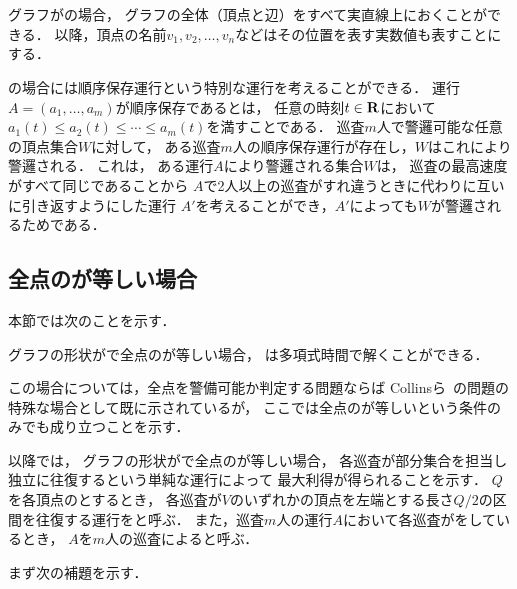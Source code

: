 \section{{\graphLine}}
\label{section: line}

グラフが{\graphLine}の場合，
グラフの全体（頂点と辺）をすべて実直線上におくことができる．
以降，頂点の名前$v_1, v_2, \ldots, v_n$などはその位置を表す実数値も表すことにする．

{\graphLine}の場合には順序保存運行という特別な運行を考えることができる．
運行$A = (a_1, \ldots, a_m)$が順序保存であるとは，
任意の時刻$t \in \mathbf R$において
$a_1(t) \leq a_2(t) \leq \cdots \leq a_m(t)$を満すことである．
巡査$m$人で警邏可能な任意の頂点集合$W$に対して，
ある巡査$m$人の順序保存運行が存在し，$W$はこれにより警邏される．
これは，
ある運行$A$により警邏される集合$W$は，
巡査の最高速度がすべて同じであることから
$A$で2人以上の巡査がすれ違うときに代わりに互いに引き返すようにした運行
$A'$を考えることができ，$A'$によっても$W$が警邏されるためである．



\subsection{全点の{\maxIdletime}が等しい場合}
\label{subsec:LineUnaryTimelimit}


本節では次のことを示す．

\begin{theo}
\label{theo:LineEqualTimelimit}
グラフの形状が{\graphLine}で全点の{\maxIdletime}が等しい場合，
{\patProb}は多項式時間で解くことができる．
\end{theo}

この場合については，全点を警備可能か判定する問題ならば
Collinsら~\cite{collins2013optimal}の問題の特殊な場合として既に示されているが，
ここでは全点の{\maxIdletime}が等しいという条件のみでも成り立つことを示す．

以降では，
グラフの形状が{\graphLine}で全点の{\maxIdletime}が等しい場合，
各巡査が部分集合を担当し独立に往復するという単純な運行によって
最大利得が得られることを示す．
$Q$を各頂点の{\maxIdletime}とするとき，
各巡査が$V$のいずれかの頂点を左端とする長さ$Q/2$の区間を往復する運行を{\indSectOperation}と呼ぶ．
また，巡査$m$人の運行$A$において各巡査が{\indSectOperation}をしているとき，
$A$を$m$人の巡査による{\indSectOperation}と呼ぶ．


まず次の補題を示す．

